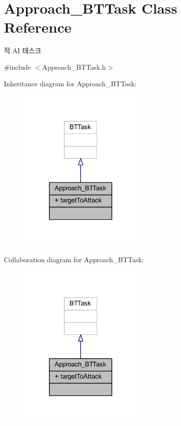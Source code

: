 \hypertarget{class_approach___b_t_task}{}\section{Approach\+\_\+\+B\+T\+Task Class Reference}
\label{class_approach___b_t_task}


적 AI 태스크  




{\ttfamily \#include $<$Approach\+\_\+\+B\+T\+Task.\+h$>$}



Inheritance diagram for Approach\+\_\+\+B\+T\+Task\+:
\nopagebreak
\begin{figure}[H]
\begin{center}
\leavevmode
\includegraphics[width=176pt]{class_approach___b_t_task__inherit__graph}
\end{center}
\end{figure}


Collaboration diagram for Approach\+\_\+\+B\+T\+Task\+:
\nopagebreak
\begin{figure}[H]
\begin{center}
\leavevmode
\includegraphics[width=176pt]{class_approach___b_t_task__coll__graph}
\end{center}
\end{figure}
